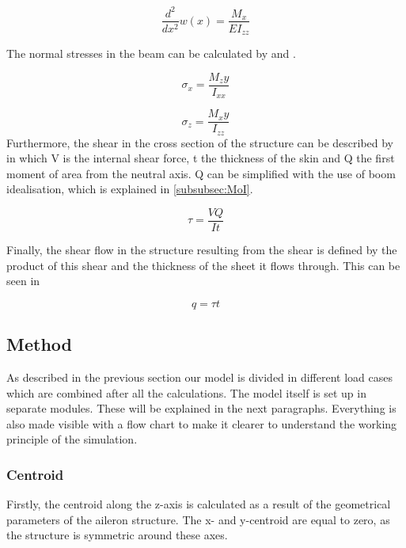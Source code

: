 \begin{equation}
    \frac{d^2}{d x^2}w(x) = \frac{M_x}{E I_{zz}}
    \label{eq:Beamformula}
\end{equation}

\noindent The normal stresses in the beam can be calculated by  and  \cite{the_book}.

\begin{equation}
    \sigma_x = \frac{M_z y}{I_{xx}}
    \label{eq:stress_bending_x}
\end{equation}

\begin{equation}
    \sigma_z = \frac{M_x y}{I_{zz}}
    \label{eq:stress_bending_z}
\end{equation}
Furthermore, the shear in the cross section of the structure can be described by  in which V is the internal shear force,  t the thickness of the skin and Q the first moment of area from the neutral axis\cite{the_book}. Q can be simplified with the use of boom idealisation, which is explained in \autoref{subsubsec:MoI}. 

\begin{equation}
    \tau = \frac{V Q}{I t}
    \label{eq:bending_shear}
\end{equation}

\noindent Finally, the shear flow in the structure resulting from the shear is defined by the product of this shear and the thickness of the sheet it flows through. This can be seen in 

\begin{equation}
\label{eq:shearflow}
    q=\tau t
\end{equation}
\subsection{Method}
As described in the previous section our model is divided in different load cases which are combined after all the calculations. The model itself is set up in separate modules. 
These will be explained in the next paragraphs. Everything is also made visible with a flow chart to make it clearer to understand the working principle of the simulation.

\subsubsection{Centroid}
Firstly, the centroid along the z-axis is calculated as a result of the geometrical parameters of the aileron structure. The x- and y-centroid are equal to zero, as the structure is symmetric around these axes.

